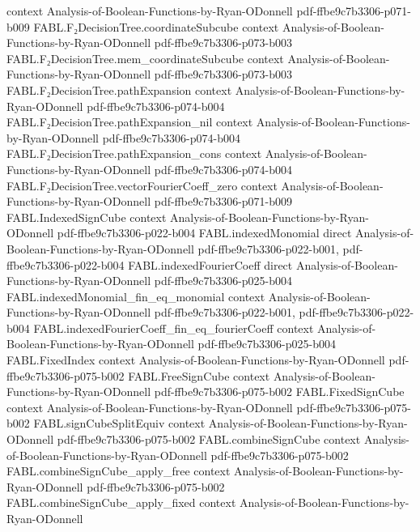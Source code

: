 \begin{theorem}
  {context}
  {Analysis-of-Boolean-Functions-by-Ryan-ODonnell}
  {pdf-ffbe9c7b3306-p071-b009}
\proofstep
  {FABL.F₂DecisionTree.coordinateSubcube}
  {context}
  {Analysis-of-Boolean-Functions-by-Ryan-ODonnell}
  {pdf-ffbe9c7b3306-p073-b003}
\proofstep
  {FABL.F₂DecisionTree.mem_coordinateSubcube}
  {context}
  {Analysis-of-Boolean-Functions-by-Ryan-ODonnell}
  {pdf-ffbe9c7b3306-p073-b003}
\proofstep
  {FABL.F₂DecisionTree.pathExpansion}
  {context}
  {Analysis-of-Boolean-Functions-by-Ryan-ODonnell}
  {pdf-ffbe9c7b3306-p074-b004}
\proofstep
  {FABL.F₂DecisionTree.pathExpansion_nil}
  {context}
  {Analysis-of-Boolean-Functions-by-Ryan-ODonnell}
  {pdf-ffbe9c7b3306-p074-b004}
\proofstep
  {FABL.F₂DecisionTree.pathExpansion_cons}
  {context}
  {Analysis-of-Boolean-Functions-by-Ryan-ODonnell}
  {pdf-ffbe9c7b3306-p074-b004}
\proofstep
  {FABL.F₂DecisionTree.vectorFourierCoeff_zero}
  {context}
  {Analysis-of-Boolean-Functions-by-Ryan-ODonnell}
  {pdf-ffbe9c7b3306-p071-b009}
\proofstep
  {FABL.IndexedSignCube}
  {context}
  {Analysis-of-Boolean-Functions-by-Ryan-ODonnell}
  {pdf-ffbe9c7b3306-p022-b004}
\proofstep
  {FABL.indexedMonomial}
  {direct}
  {Analysis-of-Boolean-Functions-by-Ryan-ODonnell}
  {pdf-ffbe9c7b3306-p022-b001,
    pdf-ffbe9c7b3306-p022-b004}
\proofstep
  {FABL.indexedFourierCoeff}
  {direct}
  {Analysis-of-Boolean-Functions-by-Ryan-ODonnell}
  {pdf-ffbe9c7b3306-p025-b004}
\proofstep
  {FABL.indexedMonomial_fin_eq_monomial}
  {context}
  {Analysis-of-Boolean-Functions-by-Ryan-ODonnell}
  {pdf-ffbe9c7b3306-p022-b001,
    pdf-ffbe9c7b3306-p022-b004}
\proofstep
  {FABL.indexedFourierCoeff_fin_eq_fourierCoeff}
  {context}
  {Analysis-of-Boolean-Functions-by-Ryan-ODonnell}
  {pdf-ffbe9c7b3306-p025-b004}
\proofstep
  {FABL.FixedIndex}
  {context}
  {Analysis-of-Boolean-Functions-by-Ryan-ODonnell}
  {pdf-ffbe9c7b3306-p075-b002}
\proofstep
  {FABL.FreeSignCube}
  {context}
  {Analysis-of-Boolean-Functions-by-Ryan-ODonnell}
  {pdf-ffbe9c7b3306-p075-b002}
\proofstep
  {FABL.FixedSignCube}
  {context}
  {Analysis-of-Boolean-Functions-by-Ryan-ODonnell}
  {pdf-ffbe9c7b3306-p075-b002}
\proofstep
  {FABL.signCubeSplitEquiv}
  {context}
  {Analysis-of-Boolean-Functions-by-Ryan-ODonnell}
  {pdf-ffbe9c7b3306-p075-b002}
\proofstep
  {FABL.combineSignCube}
  {context}
  {Analysis-of-Boolean-Functions-by-Ryan-ODonnell}
  {pdf-ffbe9c7b3306-p075-b002}
\proofstep
  {FABL.combineSignCube_apply_free}
  {context}
  {Analysis-of-Boolean-Functions-by-Ryan-ODonnell}
  {pdf-ffbe9c7b3306-p075-b002}
\proofstep
  {FABL.combineSignCube_apply_fixed}
  {context}
  {Analysis-of-Boolean-Functions-by-Ryan-ODonnell}

\end{theorem}
